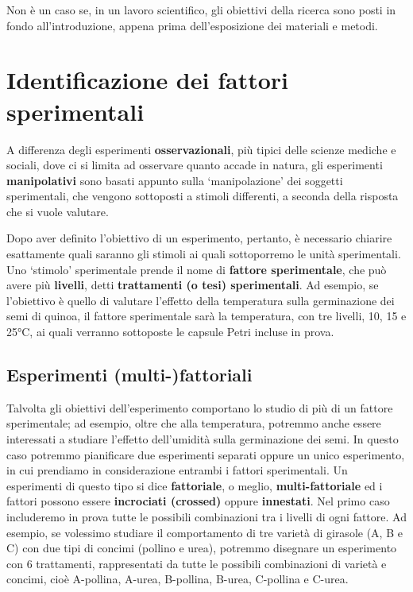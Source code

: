 \documentclass[a4paper,12pt,oneside]{book}
\begin{document}
Non è un caso se, in un lavoro scientifico, gli obiettivi della ricerca sono posti in fondo all'introduzione, appena prima dell'esposizione dei materiali e metodi.

\hypertarget{identificazione-dei-fattori-sperimentali}{%
\section{Identificazione dei fattori sperimentali}\label{identificazione-dei-fattori-sperimentali}}

A differenza degli esperimenti \textbf{osservazionali}, più tipici delle scienze mediche e sociali, dove ci si limita ad osservare quanto accade in natura, gli esperimenti \textbf{manipolativi} sono basati appunto sulla `manipolazione' dei soggetti sperimentali, che vengono sottoposti a stimoli differenti, a seconda della risposta che si vuole valutare.

Dopo aver definito l'obiettivo di un esperimento, pertanto, è necessario chiarire esattamente quali saranno gli stimoli ai quali sottoporremo le unità sperimentali. Uno `stimolo' sperimentale prende il nome di \textbf{fattore sperimentale}, che può avere più \textbf{livelli}, detti \textbf{trattamenti (o tesi) sperimentali}. Ad esempio, se l'obiettivo è quello di valutare l'effetto della temperatura sulla germinazione dei semi di quinoa, il fattore sperimentale sarà la temperatura, con tre livelli, 10, 15 e 25°C, ai quali verranno sottoposte le capsule Petri incluse in prova.

\hypertarget{esperimenti-multi-fattoriali}{%
\subsection{Esperimenti (multi-)fattoriali}\label{esperimenti-multi-fattoriali}}

Talvolta gli obiettivi dell'esperimento comportano lo studio di più di un fattore sperimentale; ad esempio, oltre che alla temperatura, potremmo anche essere interessati a studiare l'effetto dell'umidità sulla germinazione dei semi. In questo caso potremmo pianificare due esperimenti separati oppure un unico esperimento, in cui prendiamo in considerazione entrambi i fattori sperimentali. Un esperimenti di questo tipo si dice \textbf{fattoriale}, o meglio, \textbf{multi-fattoriale} ed i fattori possono essere \textbf{incrociati (crossed)} oppure \textbf{innestati}. Nel primo caso includeremo in prova tutte le possibili combinazioni tra i livelli di ogni fattore. Ad esempio, se volessimo studiare il comportamento di tre varietà di girasole (A, B e C) con due tipi di concimi (pollino e urea), potremmo disegnare un esperimento con 6 trattamenti, rappresentati da tutte le possibili combinazioni di varietà e concimi, cioè A-pollina, A-urea, B-pollina, B-urea, C-pollina e C-urea.
\end{document}
